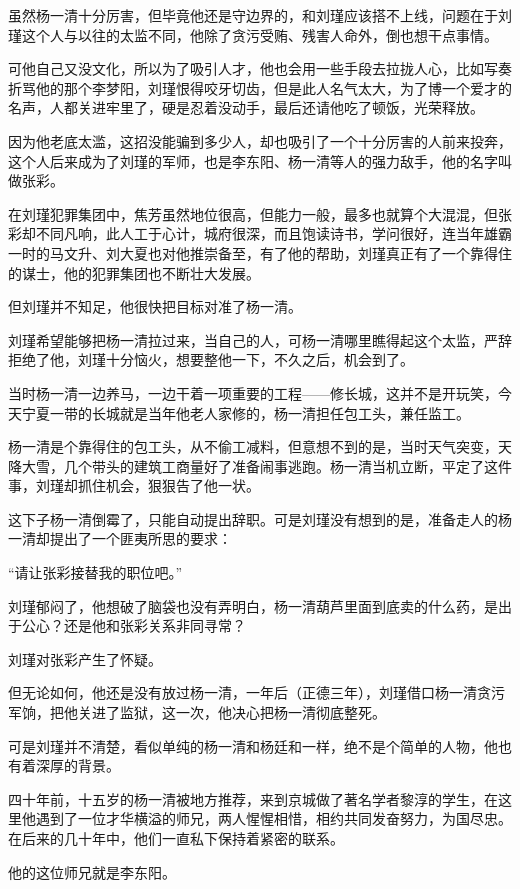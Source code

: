 \begin{multicols}{\theparacolNo}
		虽然杨一清十分厉害，但毕竟他还是守边界的，和刘瑾应该搭不上线，问题在于刘瑾这个人与以往的太监不同，他除了贪污受贿、残害人命外，倒也想干点事情。

		可他自己又没文化，所以为了吸引人才，他也会用一些手段去拉拢人心，比如写奏折骂他的那个李梦阳，刘瑾恨得咬牙切齿，但是此人名气太大，为了博一个爱才的名声，人都关进牢里了，硬是忍着没动手，最后还请他吃了顿饭，光荣释放。

		因为他老底太滥，这招没能骗到多少人，却也吸引了一个十分厉害的人前来投奔，这个人后来成为了刘瑾的军师，也是李东阳、杨一清等人的强力敌手，他的名字叫做张彩。

		在刘瑾犯罪集团中，焦芳虽然地位很高，但能力一般，最多也就算个大混混，但张彩却不同凡响，此人工于心计，城府很深，而且饱读诗书，学问很好，连当年雄霸一时的马文升、刘大夏也对他推崇备至，有了他的帮助，刘瑾真正有了一个靠得住的谋士，他的犯罪集团也不断壮大发展。

		但刘瑾并不知足，他很快把目标对准了杨一清。

		刘瑾希望能够把杨一清拉过来，当自己的人，可杨一清哪里瞧得起这个太监，严辞拒绝了他，刘瑾十分恼火，想要整他一下，不久之后，机会到了。

		当时杨一清一边养马，一边干着一项重要的工程——修长城，这并不是开玩笑，今天宁夏一带的长城就是当年他老人家修的，杨一清担任包工头，兼任监工。

		杨一清是个靠得住的包工头，从不偷工减料，但意想不到的是，当时天气突变，天降大雪，几个带头的建筑工商量好了准备闹事逃跑。杨一清当机立断，平定了这件事，刘瑾却抓住机会，狠狠告了他一状。

		这下子杨一清倒霉了，只能自动提出辞职。可是刘瑾没有想到的是，准备走人的杨一清却提出了一个匪夷所思的要求：

		“请让张彩接替我的职位吧。”

		刘瑾郁闷了，他想破了脑袋也没有弄明白，杨一清葫芦里面到底卖的什么药，是出于公心？还是他和张彩关系非同寻常？

		刘瑾对张彩产生了怀疑。

		但无论如何，他还是没有放过杨一清，一年后（正德三年），刘瑾借口杨一清贪污军饷，把他关进了监狱，这一次，他决心把杨一清彻底整死。

		可是刘瑾并不清楚，看似单纯的杨一清和杨廷和一样，绝不是个简单的人物，他也有着深厚的背景。

		四十年前，十五岁的杨一清被地方推荐，来到京城做了著名学者黎淳的学生，在这里他遇到了一位才华横溢的师兄，两人惺惺相惜，相约共同发奋努力，为国尽忠。在后来的几十年中，他们一直私下保持着紧密的联系。

		他的这位师兄就是李东阳。


\end{multicols}
